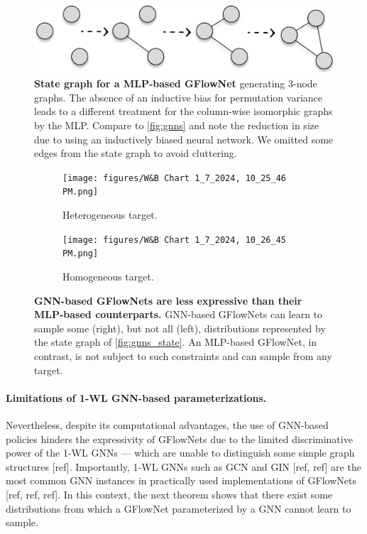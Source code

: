 \documentclass{article}
\theoremstyle{plain}
\theoremstyle{definition}
\theoremstyle{remark}
\theoremstyle{remark}
\begin{document}
\begin{figure}[!t] 
    \centering
    \includegraphics[page=2, width=\linewidth]{graphsss.pdf}
    \caption{\textbf{State graph for a MLP-based GFlowNet} generating 3-node graphs. The absence of an inductive bias for permutation variance leads to a different treatment for the column-wise isomorphic graphs by the MLP. Compare to \autoref{fig:gnns} and note the reduction in size due to using an inductively biased neural network. We omitted some edges from the state graph to avoid cluttering.} %
    \label{fig:mlps}
\end{figure}




\begin{figure}
    \centering
    \begin{subfigure}{.49\linewidth}  
        \texttt{[image: figures/W\&B Chart 1\_7\_2024, 10\_25\_46 PM.png]}
        \caption{Heterogeneous target.}
    \end{subfigure}
    \begin{subfigure}{.49\linewidth} 
        \texttt{[image: figures/W\&B Chart 1\_7\_2024, 10\_26\_45 PM.png]}
        \caption{Homogeneous target.}
    \end{subfigure}
    \caption{\textbf{GNN-based GFlowNets are less expressive than their MLP-based counterparts.} GNN-based GFlowNets can learn to sample some (right), but not all (left), distributions represented by the state graph of \autoref{fig:gnns_state}. An MLP-based GFlowNet, in contrast, is not subject to such constraints and can sample from any target.}
    \label{fig:gnns}
\end{figure}

\paragraph{Limitations of 1-WL GNN-based parameterizations.} Nevertheless, despite its computational advantages, the use of GNN-based policies hinders the expressivity of GFlowNets due to the limited discriminative power of the 1-WL GNNs --- which are unable to distinguish some simple graph structures [ref]. 
Importantly, 1-WL GNNs such as GCN and GIN [ref, ref] are the most common GNN instances in practically used implementations of GFlowNets [ref, ref, ref].
In this context, the next theorem shows that there exist some distributions from which a GFlowNet parameterized by a GNN cannot learn to sample. 
\end{document}

